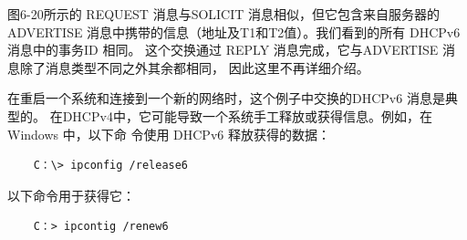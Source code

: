 图6-20所示的 REQUEST 消息与SOLICIT 消息相似，但它包含来自服务器的 ADVERTISE
消息中携带的信息（地址及T1和T2值）。我们看到的所有 DHCPv6消息中的事务ID 相同。
这个交换通过 REPLY 消息完成，它与ADVERTISE 消息除了消息类型不同之外其余都相同，
因此这里不再详细介绍。

在重启一个系统和连接到一个新的网络时，这个例子中交换的DHCPv6 消息是典型的。
在DHCPv4中，它可能导致一个系统手工释放或获得信息。例如，在 Windows 中，以下命
令使用 DHCPv6 释放获得的数据：

\begin{verbatim}
    C：\> ipconfig /release6
\end{verbatim}

以下命令用于获得它：

\begin{verbatim}
    C：> ipcontig /renew6
\end{verbatim}


